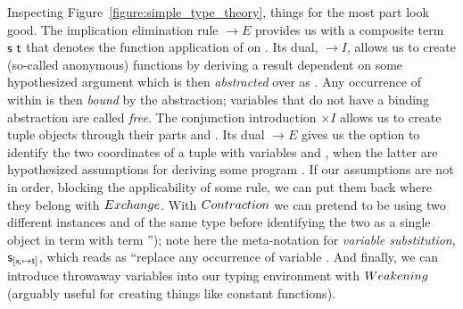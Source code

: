 Inspecting Figure~\ref{figure:simple_type_theory}, things for the most part look good.
The implication elimination rule $\to E$ provides us with a composite term $\mathsf{s~t}$ that denotes the function application of  on .
Its dual, $\to I$, allows us to create (so-called anonymous) functions by deriving a result  dependent on some hypothesized argument  which is then \textit{abstracted} over as .
Any occurrence of  within  is then \textit{bound} by the abstraction; variables that do not have a binding abstraction are called \textit{free}.
The conjunction introduction $\times I$ allows us to create tuple objects  through their parts  and .
Its dual $\to E$ gives us the option to identify the two coordinates of a tuple  with variables  and , when the latter are hypothesized assumptions for deriving some program .
If our assumptions are not in order, blocking the applicability of some rule, we can put them back where they belong with $Exchange{}$.
With $Contraction{}$ we can pretend to be using two different instances  and  of the same type before identifying the two as a single object  in term  with term '');
note here the meta-notation for \textit{variable substitution}, $\mathsf{s}_{[\mathsf{x_i} \mapsto \mathsf{t}]}$, which reads as ``replace any occurrence of variable .
And finally, we can introduce throwaway variables into our typing environment with $Weakening{}$ (arguably useful for creating things like constant functions).

